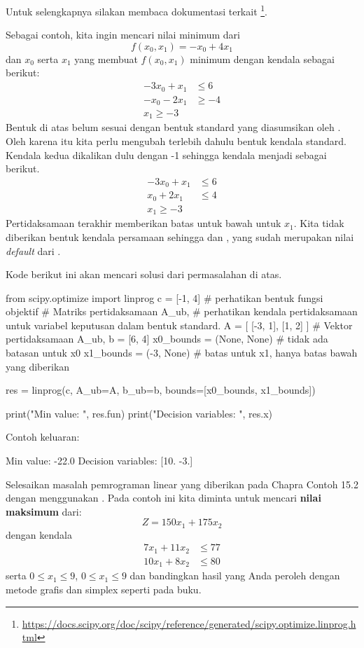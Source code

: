 Untuk selengkapnya silakan membaca dokumentasi terkait
\footnote{\url{https://docs.scipy.org/doc/scipy/reference/generated/scipy.optimize.linprog.html}}.

Sebagai contoh, kita ingin mencari nilai minimum dari
\begin{equation*}
f(x_0, x_1) = -x_0 + 4x_1
\end{equation*}
dan $x_0$ serta $x_1$ yang membuat $f(x_0, x_1)$ minimum dengan kendala sebagai
berikut:
\begin{align*}
-3x_0 + x_1 & \leq 6 \\
-x_0 - 2x_1 & \geq -4 \\
x_1 \geq -3
\end{align*}
Bentuk di atas belum sesuai dengan bentuk standard yang diasumsikan oleh
. Oleh karena itu kita perlu mengubah terlebih dahulu bentuk kendala
standard. Kendala kedua dikalikan dulu dengan -1 sehingga kendala menjadi
sebagai berikut.
\begin{align*}
-3x_0 + x_1 & \leq 6 \\
x_0 + 2x_1 & \leq 4 \\
x_1 \geq -3
\end{align*}
Pertidaksamaan terakhir memberikan batas untuk bawah untuk $x_1$.
Kita tidak diberikan bentuk kendala persamaan sehingga  dan
, yang sudah merupakan nilai \textit{default} dari .

Kode berikut ini akan mencari solusi dari permasalahan di atas.
\begin{pythoncode}
from scipy.optimize import linprog
c = [-1, 4] # perhatikan bentuk fungsi objektif
# Matriks pertidaksamaan A_ub,
# perhatikan kendala pertidaksamaan untuk variabel keputusan dalam bentuk standard.
A = [
    [-3, 1],
    [1, 2]
]
# Vektor pertidaksamaan A_ub,
b = [6, 4]
x0_bounds = (None, None) # tidak ada batasan untuk x0
x1_bounds = (-3, None) # batas untuk x1, hanya batas bawah yang diberikan

res = linprog(c, A_ub=A, b_ub=b, bounds=[x0_bounds, x1_bounds])

print("Min value: ", res.fun)
print("Decision variables: ", res.x)
\end{pythoncode}

Contoh keluaran:
\begin{textcode}
Min value:  -22.0
Decision variables:  [10. -3.]
\end{textcode}


\begin{soal}
Selesaikan masalah pemrograman linear yang diberikan pada Chapra Contoh 15.2
dengan menggunakan .
Pada contoh ini kita diminta untuk mencari \textbf{nilai maksimum} dari:
\begin{equation*}
Z = 150x_1 + 175x_2
\end{equation*}
dengan kendala
\begin{align*}
7x_1 + 11x_2 & \leq 77 \\
10x_1 + 8x_2 & \leq 80
\end{align*}
serta $0 \leq x_1 \leq 9$, $0 \leq x_1 \leq 9$ dan bandingkan hasil yang Anda
peroleh dengan metode grafis dan simplex seperti pada buku.
\end{soal}

